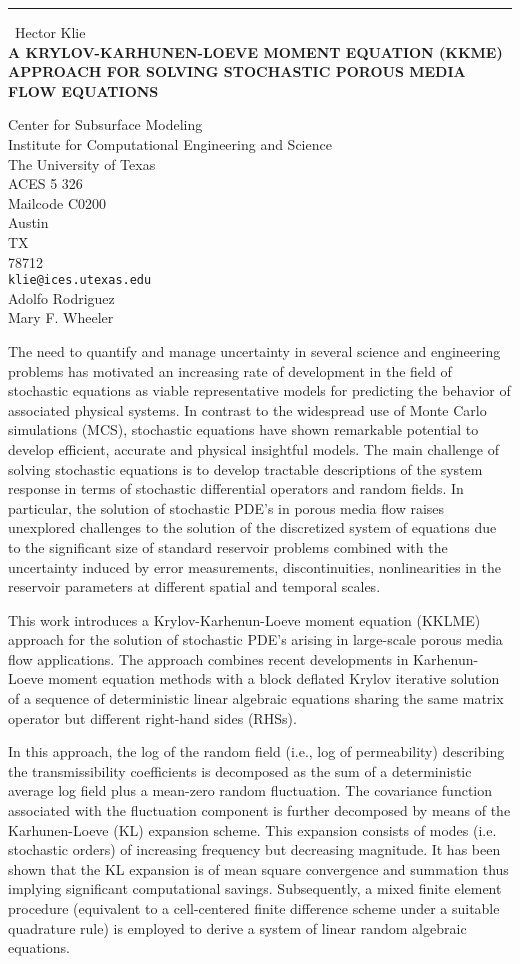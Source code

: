 \documentclass{report}
\begin{document}
\begin{center}
\rule{6in}{1pt} \
{\large Hector Klie \\
{\bf A KRYLOV-KARHUNEN-LOEVE MOMENT EQUATION (KKME) APPROACH FOR SOLVING STOCHASTIC POROUS MEDIA FLOW EQUATIONS}}

Center for Subsurface Modeling \\ Institute for Computational Engineering and Science \\ The University of Texas \\ ACES 5 326 \\ Mailcode C0200 \\ Austin \\ TX \\ 78712
\\
{\tt klie@ices.utexas.edu}\\
Adolfo Rodriguez \\
Mary F. Wheeler\end{center}

The need to quantify and manage uncertainty in several science and
engineering problems has motivated an increasing rate of development in
the field of stochastic equations as viable representative models for
predicting the behavior of associated physical systems. In contrast to
the widespread use of Monte Carlo simulations (MCS), stochastic equations
have shown remarkable potential to develop efficient, accurate and
physical insightful models. The main challenge of solving stochastic
equations is to develop tractable descriptions of the system response in
terms of stochastic differential operators and random fields. In
particular, the solution of stochastic PDE's in porous media flow raises
unexplored challenges to the solution of the discretized system of
equations due to the significant size of standard reservoir problems
combined with the uncertainty induced by error measurements,
discontinuities, nonlinearities in the reservoir parameters at different
spatial and temporal scales.

This work introduces a Krylov-Karhenun-Loeve moment equation (KKLME)
approach for the solution of stochastic PDE's arising in large-scale
porous media flow applications. The approach combines recent developments
in Karhenun-Loeve moment equation methods with a block deflated Krylov
iterative solution of a sequence of deterministic linear algebraic
equations sharing the same matrix operator but different right-hand sides
(RHSs).

In this approach, the log of the random field (i.e., log of permeability)
describing the transmissibility coefficients is decomposed as the sum of
a deterministic average log field plus a mean-zero random fluctuation.
The covariance function associated with the fluctuation component is
further decomposed by means of the Karhunen-Loeve (KL) expansion scheme.
This expansion consists of modes (i.e. stochastic orders) of increasing
frequency but decreasing magnitude. It has been shown that the KL
expansion is of mean square convergence and summation thus implying
significant computational savings. Subsequently, a mixed finite element
procedure (equivalent to a cell-centered finite difference scheme under a
suitable quadrature rule) is employed to derive a system of linear random
algebraic equations.
\end{document}
